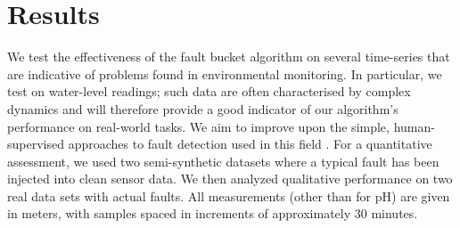 \documentclass[twoside]{article}
\begin{document}
\section{Results}
We test the effectiveness of the fault bucket algorithm on several time-series
that are indicative of problems found in environmental
monitoring. In particular, we test on water-level readings; such data
are often characterised by complex dynamics and will therefore provide
a good indicator of our algorithm's performance on real-world
tasks. We aim to improve upon the simple, human-supervised approaches
to fault detection used in this field
\citep{wagner2006guidelines}. For a quantitative assessment, we used two semi-synthetic datasets
where a typical fault has been injected into clean sensor data. We
then analyzed qualitative performance on two real data sets with actual
faults. All measurements (other than for pH) are given in meters, with samples spaced in
increments of approximately 30 minutes. %


\end{document}
